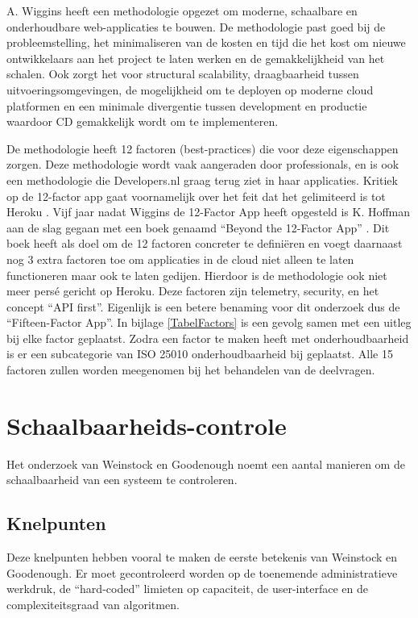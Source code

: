 A. Wiggins \parencite{12Factor} heeft een methodologie opgezet om moderne, schaalbare en onderhoudbare web-applicaties te bouwen. De methodologie past goed bij de probleemstelling, het minimaliseren van de kosten en tijd die het kost om nieuwe ontwikkelaars aan het project te laten werken en de gemakkelijkheid van het schalen. Ook zorgt het voor structural scalability, draagbaarheid tussen uitvoeringsomgevingen, de mogelijkheid om te deployen op moderne cloud platformen en een minimale divergentie tussen development en productie waardoor CD gemakkelijk wordt om te implementeren.

De methodologie heeft 12 factoren (best-practices) die voor deze eigenschappen zorgen. Deze methodologie wordt vaak aangeraden door professionals, en is ook een methodologie die Developers.nl graag terug ziet in haar applicaties. Kritiek op de 12-factor app gaat voornamelijk over het feit dat het gelimiteerd is tot Heroku \parencite{AdaptingTwelveFactor}. Vijf jaar nadat Wiggins de 12-Factor App heeft opgesteld is K. Hoffman aan de slag gegaan met een boek genaamd \enquote{Beyond the 12-Factor App} \parencite{Beyond12Factor}. Dit boek heeft als doel om de 12 factoren concreter te definiëren en voegt daarnaast nog 3 extra factoren toe om applicaties in de cloud niet alleen te laten functioneren maar ook te laten gedijen. Hierdoor is de methodologie ook niet meer persé gericht op Heroku. Deze factoren zijn telemetry, security, en het concept \enquote{API first}. Eigenlijk is een betere benaming voor dit onderzoek dus de \enquote{Fifteen-Factor App}. In bijlage \ref{TabelFactors} is een gevolg samen met een uitleg bij elke factor geplaatst. Zodra een factor te maken heeft met onderhoudbaarheid is er een subcategorie van ISO 25010 onderhoudbaarheid bij geplaatst. Alle 15 factoren zullen worden meegenomen bij het behandelen van de deelvragen.

\section{Schaalbaarheids-controle}

Het onderzoek van Weinstock en Goodenough \parencite{OnSystemScalability} noemt een aantal manieren om de schaalbaarheid van een systeem te controleren.

\subsection{Knelpunten}
Deze knelpunten hebben vooral te maken de eerste betekenis van Weinstock en Goodenough. Er moet gecontroleerd worden op de toenemende administratieve werkdruk, de \enquote{hard-coded} limieten op capaciteit, de user-interface en de complexiteitsgraad van algoritmen.

